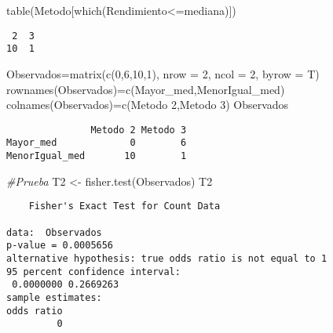 \documentclass[
  a4paper,
  oneside,
  openany]{book}
\newenvironment{Shaded}{\begin{snugshade}}{\end{snugshade}}
\newcommand{\AttributeTok}[1]{\textcolor[rgb]{0.77,0.63,0.00}{#1}}
\newcommand{\CommentTok}[1]{\textcolor[rgb]{0.56,0.35,0.01}{\textit{#1}}}
\newcommand{\DecValTok}[1]{\textcolor[rgb]{0.00,0.00,0.81}{#1}}
\newcommand{\FunctionTok}[1]{\textcolor[rgb]{0.00,0.00,0.00}{#1}}
\newcommand{\NormalTok}[1]{#1}
\newcommand{\OtherTok}[1]{\textcolor[rgb]{0.56,0.35,0.01}{#1}}
\newcommand{\SpecialCharTok}[1]{\textcolor[rgb]{0.00,0.00,0.00}{#1}}
\newcommand{\StringTok}[1]{\textcolor[rgb]{0.31,0.60,0.02}{#1}}
\begin{document}
\begin{Shaded}
\begin{Highlighting}[]
\FunctionTok{table}\NormalTok{(Metodo[}\FunctionTok{which}\NormalTok{(Rendimiento}\SpecialCharTok{\textless{}=}\NormalTok{mediana)])}
\end{Highlighting}
\end{Shaded}

\begin{verbatim}
 2  3 
10  1 
\end{verbatim}

\begin{Shaded}
\begin{Highlighting}[]
\NormalTok{Observados}\OtherTok{=}\FunctionTok{matrix}\NormalTok{(}\FunctionTok{c}\NormalTok{(}\DecValTok{0}\NormalTok{,}\DecValTok{6}\NormalTok{,}\DecValTok{10}\NormalTok{,}\DecValTok{1}\NormalTok{), }\AttributeTok{nrow =} \DecValTok{2}\NormalTok{, }\AttributeTok{ncol =} \DecValTok{2}\NormalTok{, }\AttributeTok{byrow =}\NormalTok{ T)}
\FunctionTok{rownames}\NormalTok{(Observados)}\OtherTok{=}\FunctionTok{c}\NormalTok{(}\StringTok{\textquotesingle{}Mayor\_med\textquotesingle{}}\NormalTok{,}\StringTok{\textquotesingle{}MenorIgual\_med\textquotesingle{}}\NormalTok{)}
\FunctionTok{colnames}\NormalTok{(Observados)}\OtherTok{=}\FunctionTok{c}\NormalTok{(}\StringTok{\textquotesingle{}Metodo 2\textquotesingle{}}\NormalTok{,}\StringTok{\textquotesingle{}Metodo 3\textquotesingle{}}\NormalTok{)}
\NormalTok{Observados}
\end{Highlighting}
\end{Shaded}

\begin{verbatim}
               Metodo 2 Metodo 3
Mayor_med             0        6
MenorIgual_med       10        1
\end{verbatim}

\begin{Shaded}
\begin{Highlighting}[]
\CommentTok{\#Prueba}
\NormalTok{T2 }\OtherTok{\textless{}{-}} \FunctionTok{fisher.test}\NormalTok{(Observados)}
\NormalTok{T2}
\end{Highlighting}
\end{Shaded}

\begin{verbatim}
    Fisher's Exact Test for Count Data

data:  Observados
p-value = 0.0005656
alternative hypothesis: true odds ratio is not equal to 1
95 percent confidence interval:
 0.0000000 0.2669263
sample estimates:
odds ratio 
         0 
\end{verbatim}
\end{document}
